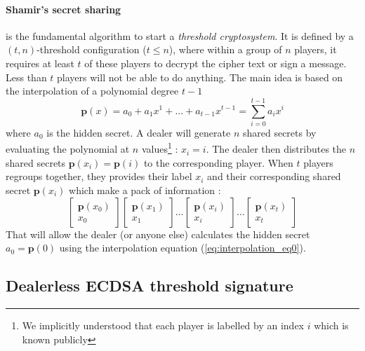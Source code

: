 \documentclass[a4paper,10pt]{article}
\begin{document}
\paragraph{Shamir's secret sharing} is the fundamental algorithm to start a \textit{threshold cryptosystem}. It is defined by a $(t,n)$-threshold configuration ($t \leq n$), where within a group of $n$ players, it requires at least $t$ of these players to decrypt the cipher text or sign a message. Less than $t$ players will not be able to do anything. The main idea is based on the interpolation of a polynomial degree $t-1$
\[ 
\textbf{p}(x) = a_0 + a_1 x^1 +...+ a_{t-1} x^{t-1} = \sum^{t-1}_{i=0} a_i x^i
\]
where $a_0$ is the hidden secret. A dealer will generate $n$ shared secrets by evaluating the polynomial at $n$ values\footnote{We implicitly understood that each player is labelled by an index $i$ which is known publicly} : $x_i=i$. The dealer then distributes the $n$ shared secrets $\textbf{p}(x_i)=\textbf{p}(i)$ to the corresponding player. When $t$ players regroups together, they provides their label $x_i$ and their corresponding shared secret $\textbf{p}(x_i)$ which make a pack of information :
\[ 
\left[ \begin{array}{c} \textbf{p}(x_0) \\ x_0 \end{array} \right]
\left[ \begin{array}{c} \textbf{p}(x_1) \\ x_1 \end{array} \right]
\dots
\left[ \begin{array}{c} \textbf{p}(x_i) \\ x_i \end{array} \right]
\dots
\left[ \begin{array}{c} \textbf{p}(x_t) \\ x_t \end{array} \right]
\]
That will allow the dealer (or anyone else) calculates the hidden secret $a_0=\textbf{p}(0)$ using the interpolation equation (\ref{eq:interpolation_eq0}).
\subsection{Dealerless ECDSA threshold signature}%
\end{document}
